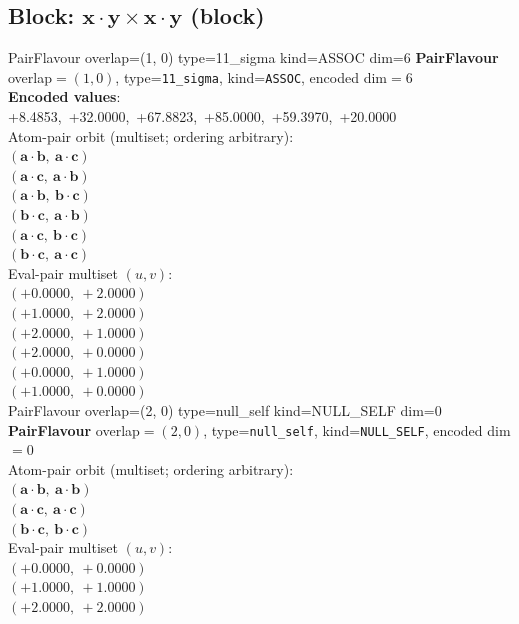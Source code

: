\documentclass[a4paper,11pt]{article}
\newcommand{\pdcegfomjfhook}[2]{\mathbf{#1} \cdot \mathbf{#2}}
\begin{document}
\subsection{Block: $\pdcegfomjfhook{x}{y} \times \pdcegfomjfhook{x}{y}$  (block)}
    PairFlavour  overlap=(1, 0)  type=11\_sigma  kind=ASSOC  dim=6
\textbf{PairFlavour} overlap$=(1, 0)$, type=\texttt{11\_sigma}, kind=\texttt{ASSOC}, encoded dim$=6$\\
\textbf{      Encoded values}: +8.4853,\ +32.0000,\ +67.8823,\ +85.0000,\ +59.3970,\ +20.0000\\
\quad Atom-pair orbit (multiset; ordering arbitrary):\\
$(\pdcegfomjfhook{a}{b},\ \pdcegfomjfhook{a}{c})$\\
$(\pdcegfomjfhook{a}{c},\ \pdcegfomjfhook{a}{b})$\\
$(\pdcegfomjfhook{a}{b},\ \pdcegfomjfhook{b}{c})$\\
$(\pdcegfomjfhook{b}{c},\ \pdcegfomjfhook{a}{b})$\\
$(\pdcegfomjfhook{a}{c},\ \pdcegfomjfhook{b}{c})$\\
$(\pdcegfomjfhook{b}{c},\ \pdcegfomjfhook{a}{c})$\\
\quad Eval-pair multiset $(u, v)$:\\
$(+0.0000,\ +2.0000)$\\
$(+1.0000,\ +2.0000)$\\
$(+2.0000,\ +1.0000)$\\
$(+2.0000,\ +0.0000)$\\
$(+0.0000,\ +1.0000)$\\
$(+1.0000,\ +0.0000)$\\
    PairFlavour  overlap=(2, 0)  type=null\_self  kind=NULL\_SELF  dim=0
\textbf{PairFlavour} overlap$=(2, 0)$, type=\texttt{null\_self}, kind=\texttt{NULL\_SELF}, encoded dim$=0$\\
\quad Atom-pair orbit (multiset; ordering arbitrary):\\
$(\pdcegfomjfhook{a}{b},\ \pdcegfomjfhook{a}{b})$\\
$(\pdcegfomjfhook{a}{c},\ \pdcegfomjfhook{a}{c})$\\
$(\pdcegfomjfhook{b}{c},\ \pdcegfomjfhook{b}{c})$\\
\quad Eval-pair multiset $(u, v)$:\\
$(+0.0000,\ +0.0000)$\\
$(+1.0000,\ +1.0000)$\\
$(+2.0000,\ +2.0000)$\\
\end{document}
